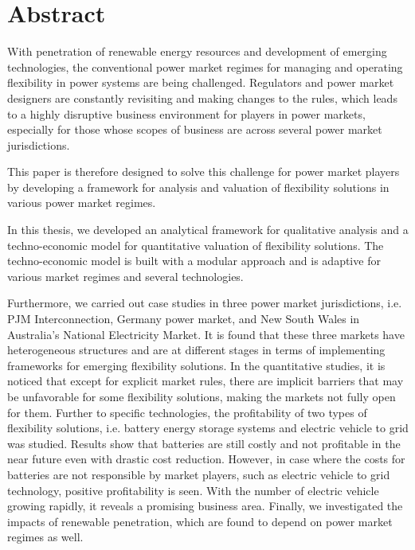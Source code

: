 \documentclass[a4paper,11pt,twoside,onecolumn]{book}
\begin{document}
\frontmatter



\chapter*{Abstract}
%

With penetration of renewable energy resources and development of emerging technologies, the conventional power market regimes for managing and operating flexibility in power systems are being challenged. Regulators and power market designers are constantly revisiting and making changes to the rules, which leads to a highly disruptive business environment for players in power markets, especially for those whose scopes of business are across several power market jurisdictions.

This paper is therefore designed to solve this challenge for power market players by developing a framework for analysis and valuation of flexibility solutions in various power market regimes.

In this thesis, %
we developed an analytical framework for qualitative analysis and a techno-economic model for quantitative valuation of flexibility solutions. The techno-economic model is built with a modular approach and is adaptive for various market regimes and several technologies. 

Furthermore, we carried out case studies in three power market jurisdictions, i.e. PJM Interconnection, Germany power market, and New South Wales in Australia's National Electricity Market. It is found that these three markets have heterogeneous structures and are at different stages in terms of implementing frameworks for emerging flexibility solutions. In the quantitative studies, it is noticed that except for explicit market rules, there are implicit barriers that may be unfavorable for some flexibility solutions, making the markets not fully open for them. Further to specific technologies, the profitability of two types of flexibility solutions, i.e. battery energy storage systems and electric vehicle to grid was studied.  Results show that batteries are still costly and not profitable in the near future even with drastic cost reduction. However, in case where the costs for batteries are not responsible by market players, such as electric vehicle to grid technology, positive profitability is seen. With the number of electric vehicle growing rapidly, it reveals a promising business area. Finally, we investigated the impacts of renewable penetration, which are found to depend on power market regimes as well.
\end{document}
